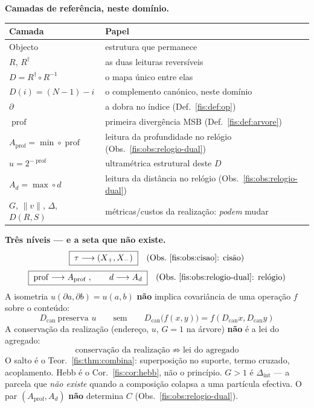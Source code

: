 \documentclass[livro.tex]{subfiles}
\begin{document}
\begin{teorema}
\medskip\noindent\textbf{Camadas de referência, neste domínio.}
\begin{center}\small
\begin{tabular}{@{}ll@{}}
\toprule
\textbf{Camada} & \textbf{Papel} \\
\midrule
Objecto & estrutura que permanece \\
$R$, $R^{\dagger}$ & as duas leituras reversíveis \\
$D=R^{\dagger}\circ R^{-1}$ & o mapa único entre elas \\
$D(i)=(N-1)-i$ & o complemento canónico, neste domínio \\
$\partial$ & a dobra no índice (Def.~\ref{fis:def:op}) \\
$\operatorname{prof}$ & primeira divergência MSB (Def.~\ref{fis:def:arvore}) \\
$A_{\mathrm{prof}}=\min\circ\operatorname{prof}$ & leitura da profundidade no relógio (Obs.~\ref{fis:obs:relogio-dual}) \\
$u=2^{-\operatorname{prof}}$ & ultramétrica estrutural deste $D$ \\
$A_d=\max\circ d$ & leitura da distância no relógio (Obs.~\ref{fis:obs:relogio-dual}) \\
$G$, $\|v\|$, $\Delta$, $D(R,S)$ & métricas/custos da realização: \emph{podem} mudar \\
\bottomrule
\end{tabular}
\end{center}

\medskip\noindent\textbf{Três níveis --- e a seta que não existe.}
\[
\boxed{\;\tau\longrightarrow(X_{+},X_{-})\;}
\quad\text{(Obs.~\ref{fis:obs:cisao}: cisão)}
\]
\[
\boxed{\;
\operatorname{prof}\longrightarrow A_{\mathrm{prof}}
\;,\qquad
d\longrightarrow A_d
\;}
\quad\text{(Obs.~\ref{fis:obs:relogio-dual}: relógio)}
\]
A isometria $u(\partial a,\partial b)=u(a,b)$ \textbf{não} implica
covariância de uma operação $f$ sobre o conteúdo:
\[
\boxed{\;
D_{\mathrm{can}}\ \text{preserva }u
\qquad\text{sem}\qquad
D_{\mathrm{can}}\bigl(f(x,y)\bigr)=f(D_{\mathrm{can}}x,D_{\mathrm{can}}y)
\;}
\]
A conservação da realização (endereço, $u$, $G=1$ na árvore)
\textbf{não} é a lei do agregado:
\[
\boxed{\;\text{conservação da realização}\;\nRightarrow\;\text{lei do agregado}\;}
\]
O salto é o Teor.~\ref{fis:thm:combina}: superposição no suporte, termo
cruzado, acoplamento. Hebb é o Cor.~\ref{fis:cor:hebb}, não o princípio.
$G>1$ é $\Delta_{\mathrm{int}}$ --- a parcela que \emph{não existe} quando a
composição colapsa a uma partícula efectiva.
O par $(A_{\mathrm{prof}},A_d)$ \textbf{não} determina $C$
(Obs.~\ref{fis:obs:relogio-dual}).
\end{teorema}
\end{document}
